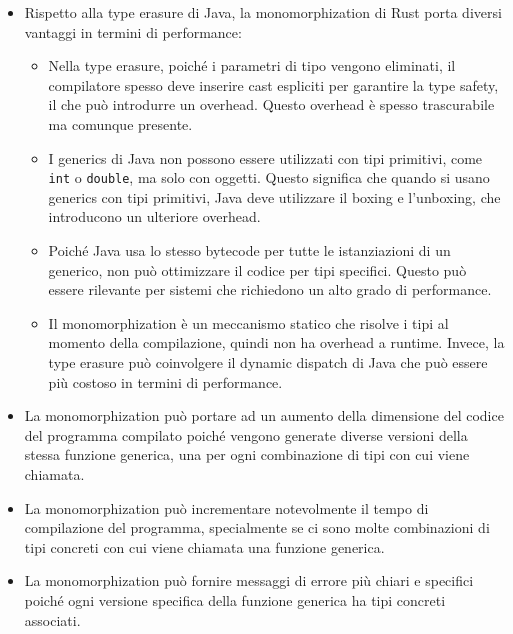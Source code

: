 \begin{itemize}
    \item Rispetto alla type erasure di Java, la monomorphization di Rust porta diversi vantaggi in termini di performance:
    \begin{itemize}
        \item Nella type erasure, poiché i parametri di tipo vengono eliminati, il compilatore spesso deve inserire cast espliciti per garantire la type safety, il che può introdurre un overhead. Questo overhead è spesso trascurabile ma comunque presente. 
        \item I generics di Java non possono essere utilizzati con tipi primitivi, come \texttt{int} o \texttt{double}, ma solo con oggetti. Questo significa che quando si usano generics con tipi primitivi, Java deve utilizzare il boxing e l'unboxing, che introducono un ulteriore overhead.
        \item Poiché Java usa lo stesso bytecode per tutte le istanziazioni di un generico, non può ottimizzare il codice per tipi specifici. Questo può essere rilevante per sistemi che richiedono un alto grado di performance.
        \item Il monomorphization è un meccanismo statico che risolve i tipi al momento della compilazione, quindi non ha overhead a runtime. Invece, la type erasure può coinvolgere il dynamic dispatch di Java che può essere più costoso in termini di performance.
    \end{itemize}
    \item La monomorphization può portare ad un aumento della dimensione del codice del programma compilato poiché vengono generate diverse versioni della stessa funzione generica, una per ogni combinazione di tipi con cui viene chiamata. 
    \item La monomorphization può incrementare notevolmente il tempo di compilazione del programma, specialmente se ci sono molte combinazioni di tipi concreti con cui viene chiamata una funzione generica.
    \item La monomorphization può fornire messaggi di errore più chiari e specifici poiché ogni versione specifica della funzione generica ha tipi concreti associati.
\end{itemize}
